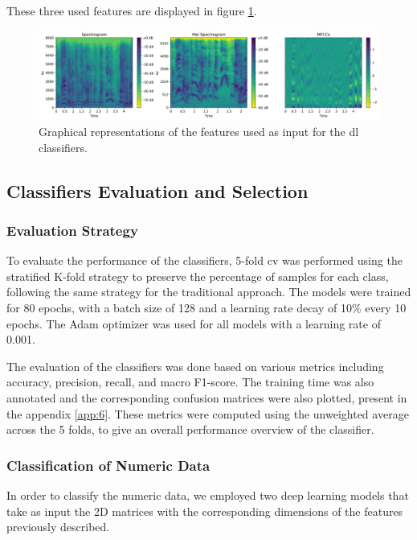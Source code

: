 These three used features are displayed in figure \ref{fig:dl_features}.

\begin{figure}[H]
	\centering
	\includegraphics[width=\textwidth]{figs/4_4_deep_learning/features.png}
	\caption{Graphical representations of the features used as input for the \ac{dl} classifiers.}
	\label{fig:dl_features}
\end{figure}



\subsection{Classifiers Evaluation and Selection}

\subsubsection{Evaluation Strategy}

To evaluate the performance of the classifiers, 5-fold \ac{cv} was performed using the stratified K-fold strategy to preserve the percentage of samples for each class, following the same strategy for the traditional approach. The models were trained for 80 epochs, with a batch size of 128 and a learning rate decay of 10\% every 10 epochs. The Adam optimizer was used for all models with a learning rate of 0.001.

The evaluation of the classifiers was done based on various metrics including accuracy, precision, recall, and macro F1-score. The training time was also annotated and the corresponding confusion matrices were also plotted, present in the appendix \ref{app:6}. These metrics were computed using the unweighted average across the 5 folds, to give an overall performance overview of the classifier.

\subsubsection{Classification of Numeric Data}

In order to classify the numeric data, we employed two deep learning models that take as input the 2D matrices with the corresponding dimensions of the features previously described.

